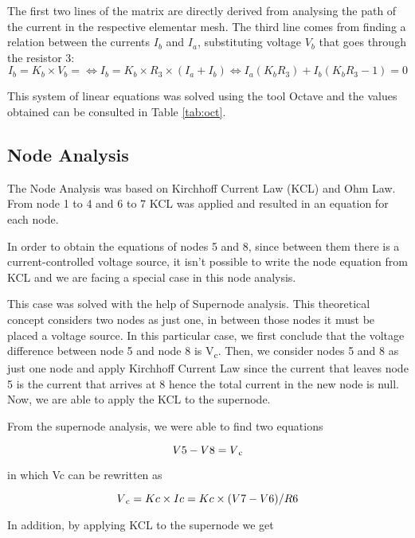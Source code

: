 The first two lines of the matrix are directly derived from analysing the path of the current in the respective elementar mesh. 
The third line comes from finding a relation between the currents $I_b$ and $I_a$,  substituting voltage $V_b$ that goes through the resistor 3:
\begin{equation}
    I_b = K_b \times V_b = \Leftrightarrow I_b = K_b \times R_3 \times (I_a + I_b) \Leftrightarrow I_a(K_b R_3) + I_b(K_b R_3 -1) = 0
\end{equation}

This system of linear equations was solved using the tool Octave and the values obtained can be consulted in Table \ref{tab:oct}.


\subsection{Node Analysis}
The Node Analysis was based on Kirchhoff Current Law (KCL) and Ohm Law.
From node 1 to  4 and 6 to 7 KCL was applied and resulted in an equation for each node.

In order to obtain the equations of nodes 5 and 8, since between them there is a current-controlled voltage source, it isn't possible to write the node equation from KCL and we are facing a special case in this node analysis. 

This case was solved with the help of Supernode analysis. This theoretical concept considers two nodes as just one, in between those nodes it must be placed a voltage source. In this particular case, we first conclude that the voltage difference between node 5 and node 8 is V\textsubscript{c}. Then, we consider nodes 5 and 8 as just one node and apply Kirchhoff Current Law since the current that leaves node 5 is the current that arrives at 8 hence the total current in the new node is null. Now, we are able to apply the KCL to the supernode. 

From the supernode analysis, we were able to find two equations

\begin{equation}
V5 - V8 = V\textsubscript{c} 
\end{equation}

in which Vc can be rewritten as 

\begin{equation}
V\textsubscript{c} = Kc\times Ic = Kc\times (V7-V6)/R6
\end{equation}

In addition, by applying KCL to the supernode we get

